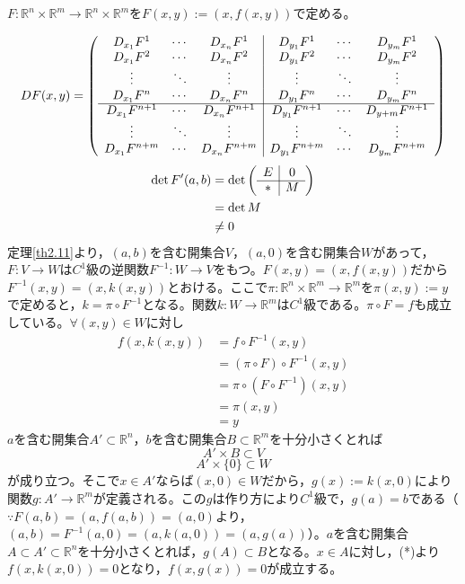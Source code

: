 \documentclass[dvipdfmx,a4j,10pt]{jsarticle}
\makeatletter
\theoremstyle{mystyle1}
\theoremstyle{mystyle2}
\renewenvironment{proof}[1][\proofname]{\par
  \pushQED{\qed}%
  \normalfont
  \topsep6\p@\@plus6\p@ \trivlist
  \item[\hskip\labelsep{\bfseries\sffamily #1}]\ignorespaces
}{%
  \popQED\endtrivlist\@endpefalse
}
\renewcommand\proofname{証明}
\makeatother
\begin{document}
\begin{proof}
	$F:\mathbb{R}^n\times\mathbb{R}^m\to\mathbb{R}^n\times\mathbb{R}^m$を$F(x,y):=(x,f(x,y))$で定める。

    \[DF(x,y)=
    \left(
    \begin{array}{ccc|ccc}
        D_{x_1}F^1 & \cdots & D_{x_n}F^1 & D_{y_1}F^1 & \cdots & D_{y_m}F^1 \\
        D_{x_1}F^2 & \cdots & D_{x_n}F^2 & D_{y_1}F^2 & \cdots & D_{y_m}F^2 \\
        \vdots & \ddots & \vdots & \vdots & \ddots & \vdots \\
        D_{x_1}F^n & \cdots & D_{x_n}F^n & D_{y_1}F^n & \cdots & D_{y_m}F^n \\ \cline{1-6}
        D_{x_1}F^{n+1} & \cdots & D_{x_n}F^{n+1} & D_{y_1}F^{n+1} & \cdots & D_{y+m}F^{n+1} \\
        \vdots & \ddots & \vdots & \vdots & \ddots & \vdots \\
        D_{x_1}F^{n+m} & \cdots & D_{x_n}F^{n+m} & D_{y_1}F^{n+m} & \cdots & D_{y_m}F^{n+m} \\
    \end{array}
    \right)
    \]
    \[
    \begin{split}
        \det F'(a,b)&=\det
        \left(\begin{array}{c|c}
            E & 0 \\ \cline{1-2}
            * & M \\
        \end{array}\right) \\
        &=\det M \\
        &\neq 0
    \end{split}
    \]
	定理\ref{th2.11}より，$(a,b)$を含む開集合$V$，$(a,0)$を含む開集合$W$があって，$F:V\to W$は$C^1$級の逆関数$F^{-1}:W\to V$をもつ。$F(x,y)=(x,f(x,y))$だから$F^{-1}(x,y)=(x,k(x,y))$とおける。ここで$\pi:\mathbb{R}^n\times\mathbb{R}^m\to\mathbb{R}^m$を$\pi(x,y):=y$で定めると，$k=\pi\circ F^{-1}$となる。関数$k:W\to\mathbb{R}^m$は$C^1$級である。$\pi\circ F=f$も成立している。$\forall (x,y)\in W$に対し
	\begin{equation}\tag{*}
		\begin{split}
			f(x,k(x,y))&=f\circ F^{-1}(x,y)\\
			&=(\pi\circ F)\circ F^{-1}(x,y)\\
			&=\pi\circ(F\circ F^{-1})(x,y)\\
			&=\pi(x,y)\\
			&=y
		\end{split}
	\end{equation}
	$a$を含む開集合$A'\subset\mathbb{R}^n$，$b$を含む開集合$B\subset\mathbb{R}^m$を十分小さくとれば
	\[
		A'\times B\subset V
	\]
	\[
		A'\times\{0\}\subset W
	\]
	が成り立つ。そこで$x\in A'$ならば$(x,0)\in W$だから，$g(x):=k(x,0)$により関数$g:A'\to\mathbb{R}^m$が定義される。この$g$は作り方により$C^1$級で，$g(a)=b$である（$\because F(a,b)=(a,f(a,b))=(a,0)$より，$(a,b)=F^{-1}(a,0)=(a,k(a,0))=(a,g(a))$）。$a$を含む開集合$A\subset A'\subset \mathbb{R}^n$を十分小さくとれば，$g(A)\subset B$となる。$x\in A$に対し，(*)より$f(x,k(x,0))=0$となり，$f(x,g(x))=0$が成立する。


\end{proof}
\end{document}
